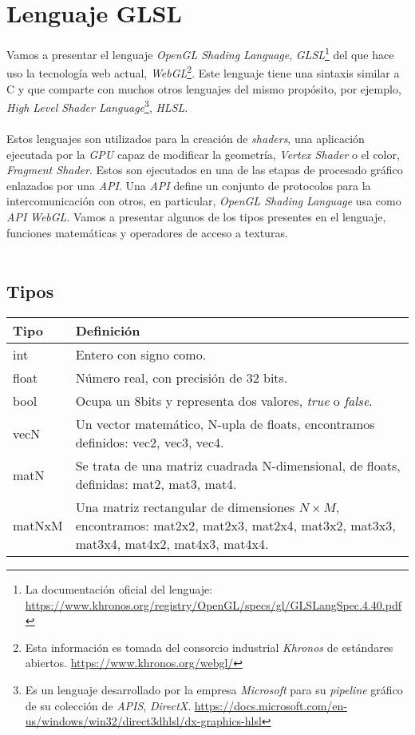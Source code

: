 \chapter{Lenguaje GLSL\label{ch:glsl}}

Vamos a presentar el lenguaje \textit{OpenGL Shading Language}, \textit{GLSL}\footnote{La documentación\label{footnote:doc} oficial del lenguaje: \url{https://www.khronos.org/registry/OpenGL/specs/gl/GLSLangSpec.4.40.pdf}} del que hace uso la tecnología web actual, \textit{WebGL}\footnote{Esta información es tomada del consorcio industrial \textit{Khronos} de estándares abiertos. \url{https://www.khronos.org/webgl/}}. Este lenguaje tiene una sintaxis similar a C y que comparte con muchos otros lenguajes del mismo propósito, por ejemplo, \textit{High Level Shader Language}\footnote{Es un lenguaje desarrollado por la empresa \textit{Microsoft} para su \textit{pipeline} gráfico de su colección de \textit{APIS}, \textit{DirectX}. \url{https://docs.microsoft.com/en-us/windows/win32/direct3dhlsl/dx-graphics-hlsl}}, \textit{HLSL}.\\\\
Estos lenguajes son utilizados para la creación de \textit{shaders}, una aplicación ejecutada por la \textit{GPU} capaz de modificar la geometría, \textit{Vertex Shader} o el color, \textit{Fragment Shader}. Estos son ejecutados en una de las etapas de procesado gráfico enlazados por una \textit{API}. Una \textit{API} define un conjunto de protocolos para la intercomunicación con otros, en particular, \textit{OpenGL Shading Language} usa como \textit{API} \textit{WebGL}. Vamos a presentar algunos de los tipos presentes en el lenguaje, funciones matemáticas y operadores de acceso a texturas.\\\\

\section{Tipos}
\begin{table}[H]
\begin{tabularx}{\textwidth}{l|X}
  \toprule
  Tipo & Definición\\
  \midrule
  int & Entero con signo como.\\
  float & Número real, con precisión de 32 bits. \\
  bool & Ocupa un 8bits y representa dos valores, \textit{true} o \textit{false}. \\
  vecN & Un vector matemático, N-upla de floats, encontramos definidos: vec2, vec3, vec4. \\
  matN & Se trata de una matriz cuadrada N-dimensional, de floats, definidas: mat2, mat3, mat4. \\
  matNxM & Una matriz rectangular de dimensiones \(N\times M\), encontramos: mat2x2, mat2x3, mat2x4, mat3x2, mat3x3, mat3x4, mat4x2, mat4x3, mat4x4. \\
  \bottomrule
\end{tabularx}
\end{table}
\newpage

